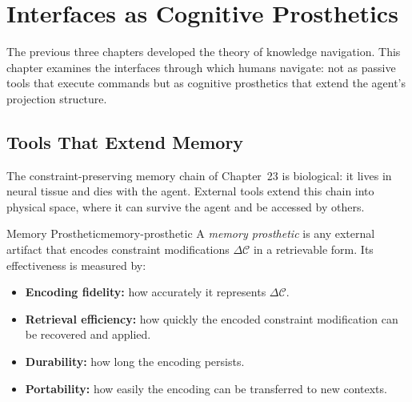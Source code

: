 \chapter{Interfaces as Cognitive Prosthetics}



The previous three chapters developed the theory of knowledge navigation.
This chapter examines the interfaces through which humans navigate:
not as passive tools that execute commands but as cognitive prosthetics
that extend the agent's projection structure.

\section{Tools That Extend Memory}

The constraint-preserving memory chain of Chapter~23 is biological:
it lives in neural tissue and dies with the agent. External tools extend
this chain into physical space, where it can survive the agent and be
accessed by others.

\begin{definition}{Memory Prosthetic}{memory-prosthetic}
  A \emph{memory prosthetic} is any external artifact that encodes
  constraint modifications $\Delta\mathcal{C}$ in a retrievable form.
  Its effectiveness is measured by:
  \begin{itemize}
    \item \textbf{Encoding fidelity:} how accurately it represents
          $\Delta\mathcal{C}$.
    \item \textbf{Retrieval efficiency:} how quickly the encoded
          constraint modification can be recovered and applied.
    \item \textbf{Durability:} how long the encoding persists.
    \item \textbf{Portability:} how easily the encoding can be
          transferred to new contexts.
  \end{itemize}
\end{definition}

